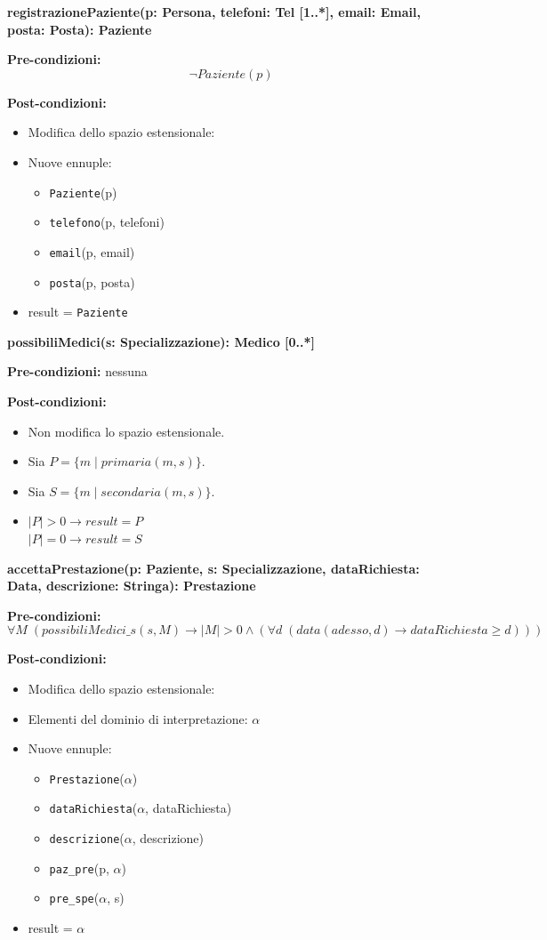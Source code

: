 \documentclass{article}
\begin{document}
\textbf{registrazionePaziente(p: Persona, telefoni: Tel [1..*], email: Email, posta: Posta): Paziente}

\textbf{Pre-condizioni:} 
\[
\neg Paziente(p)
\]

\textbf{Post-condizioni:}
\begin{itemize}
    \item Modifica dello spazio estensionale:
    \item Nuove ennuple:
    \begin{itemize}
        \item \texttt{Paziente}(p)
        \item \texttt{telefono}(p, telefoni)
        \item \texttt{email}(p, email)
        \item \texttt{posta}(p, posta)
    \end{itemize}
    \item result = \texttt{Paziente}
\end{itemize}

\textbf{possibiliMedici(s: Specializzazione): Medico [0..*]}

\textbf{Pre-condizioni:} nessuna

\textbf{Post-condizioni:}
\begin{itemize}
    \item Non modifica lo spazio estensionale.
    \item Sia \( P = \{m \mid primaria(m,s)\} \).
    \item Sia \( S = \{m \mid secondaria(m,s)\} \).
    \item \(|P| > 0 \rightarrow result = P \) \\
    \(|P| = 0 \rightarrow result = S \)
\end{itemize}

\textbf{accettaPrestazione(p: Paziente, s: Specializzazione, dataRichiesta: Data, descrizione: Stringa): Prestazione}

\textbf{Pre-condizioni:}
\[
\forall M \; (possibiliMedici\_s(s,M) \rightarrow |M| > 0 \land (\forall d \; (data(adesso,d) \rightarrow dataRichiesta \geq d)))
\]

\textbf{Post-condizioni:}
\begin{itemize}
    \item Modifica dello spazio estensionale:
    \item Elementi del dominio di interpretazione: \( \alpha \)
    \item Nuove ennuple:
    \begin{itemize}
        \item \texttt{Prestazione}(\(\alpha\))
        \item \texttt{dataRichiesta}(\(\alpha\), dataRichiesta)
        \item \texttt{descrizione}(\(\alpha\), descrizione)
        \item \texttt{paz\_pre}(p, \(\alpha\))
        \item \texttt{pre\_spe}(\(\alpha\), s)
    \end{itemize}
    \item result = \( \alpha \)
\end{itemize}
\end{document}
